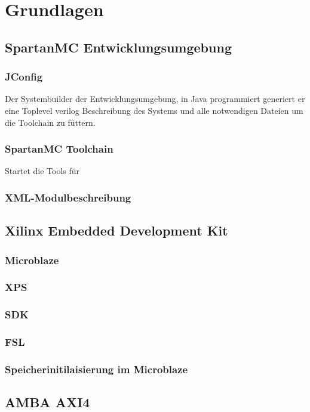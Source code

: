 \chapter{Grundlagen}
\section{SpartanMC Entwicklungsumgebung}
\subsection{JConfig}
Der Systembuilder der Entwicklungsumgebung, in Java programmiert generiert er eine Toplevel verilog Beschreibung
des Systems und alle notwendigen Dateien um die Toolchain zu füttern.
\subsection{SpartanMC Toolchain}
Startet die Tools für 
\subsection{XML-Modulbeschreibung}

\section{Xilinx Embedded Development Kit}
\subsection{Microblaze}

\subsection{XPS}

\subsection{SDK}

\subsection{FSL}

\subsection{Speicherinitilaisierung im Microblaze}

\section{AMBA AXI4}

